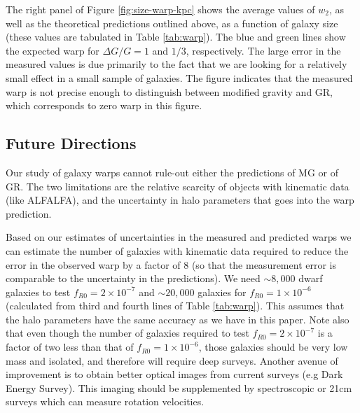\documentclass[useAMS,usenatbib,twocolumn]{mn2e}
\begin{document}
The right panel of Figure \ref{fig:size-warp-kpc} shows the average
values of $w_2$, as well as the theoretical predictions outlined
above, as a function of galaxy size (these values are tabulated
in Table \ref{tab:warp}).
The blue and green lines show the expected warp for $\Delta G/G
= 1$ and $1/3$, respectively.
The large error in the measured values
is due primarily to the fact that we are looking for a
relatively small effect in a small sample of galaxies.
The figure indicates that the measured warp is not precise enough to
distinguish between modified gravity and GR, which corresponds to zero
warp in this figure.


\subsection{Future Directions}
Our study of galaxy warps cannot rule-out either the predictions of
MG or of GR.  The two limitations are the relative
scarcity of objects with kinematic data (like ALFALFA), and the uncertainty
in halo parameters that goes into the warp prediction.

Based on our estimates of
uncertainties in the measured and predicted warps we can estimate
the number of galaxies with kinematic data required to
reduce the error in the observed warp by a factor of 8 (so that
the measurement error is comparable to the uncertainty in the predictions). 
We need $\sim 8,000$ dwarf galaxies to test $f_{R0} =
2\times10^{-7}$ and $\sim 20,000$ galaxies for $f_{R0} =
1\times10^{-6}$ (calculated from third and fourth lines of Table
\ref{tab:warp}). This assumes that the halo parameters have the same accuracy as we have in
this paper.  Note also that even though the number of
galaxies required to test $f_{R0} = 2\times10^{-7}$ is a factor of two
less than that of $f_{R0} = 1\times10^{-6}$, those galaxies should be
very low mass and isolated, and therefore will require deep surveys.
Another avenue of improvement is to obtain better optical images from
current surveys (e.g Dark Energy Survey). This imaging should be supplemented
by spectroscopic or 21cm surveys which can measure rotation velocities.
\end{document}
